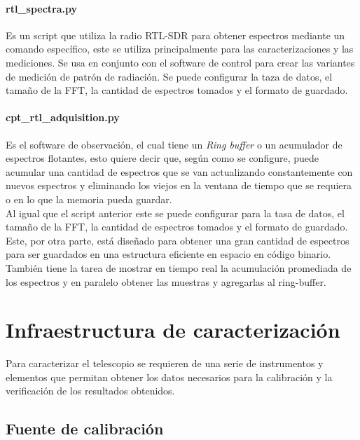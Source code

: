 \paragraph{rtl\_spectra.py} Es un script que utiliza la radio RTL-SDR para obtener espectros mediante un comando específico, este se utiliza principalmente para las caracterizaciones y las mediciones. Se usa en conjunto con el software de control para crear las variantes de medición de patrón de radiación. Se puede configurar la taza de datos, el tamaño de la FFT, la cantidad de espectros tomados y el formato de guardado.\\

\paragraph{cpt\_rtl\_adquisition.py} Es el software de observación, el cual tiene un \textit{Ring buffer} o un acumulador de espectros flotantes, esto quiere decir que, según como se configure, puede acumular una cantidad de espectros que se van actualizando constantemente con nuevos espectros y eliminando los viejos en la ventana de tiempo que se requiera o en lo que la memoria pueda guardar.\\

Al igual que el script anterior este se puede configurar para la tasa de datos, el tamaño de la FFT, la cantidad de espectros tomados y el formato de guardado. Este, por otra parte, está diseñado para obtener una gran cantidad de espectros para ser guardados en una estructura eficiente en espacio en código binario. También tiene la tarea de mostrar en tiempo real la acumulación promediada de los espectros y en paralelo obtener las muestras y agregarlas al ring-buffer.\\


\section{Infraestructura de caracterización}

Para caracterizar el telescopio se requieren de una serie de instrumentos y elementos que permitan obtener los datos necesarios para la calibración y la verificación de los resultados obtenidos.\\

\subsection{Fuente de calibración}

